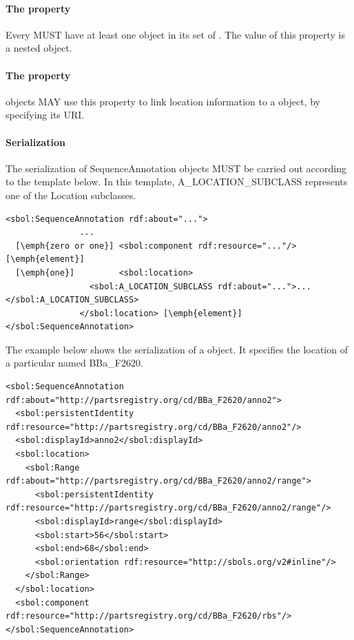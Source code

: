 \paragraph{The  property}\label{sec:locations}
\label{sec:locations}
Every  MUST have at least one  object in its set of . The value of this property is a nested  object.


\paragraph{The  property}\label{sec:component}
 objects MAY use this property to link location information to a  object, by specifying its URI.


\paragraph{Serialization}

The serialization of SequenceAnnotation objects MUST be carried out according to the template below. In this template, A\_LOCATION\_SUBCLASS represents one of the Location subclasses.
\begin{lstlisting}
<sbol:SequenceAnnotation rdf:about="...">
               ...   
  [\emph{zero or one}] <sbol:component rdf:resource="..."/> [\emph{element}] 
  [\emph{one}]         <sbol:location>
                 <sbol:A_LOCATION_SUBCLASS rdf:about="...">...</sbol:A_LOCATION_SUBCLASS>
               </sbol:location> [\emph{element}] 
</sbol:SequenceAnnotation>
\end{lstlisting}

The example below shows the serialization of a  object. It specifies the location of a particular  named BBa\_F2620.
\begin{lstlisting}
<sbol:SequenceAnnotation rdf:about="http://partsregistry.org/cd/BBa_F2620/anno2">
  <sbol:persistentIdentity rdf:resource="http://partsregistry.org/cd/BBa_F2620/anno2"/>
  <sbol:displayId>anno2</sbol:displayId>
  <sbol:location>
    <sbol:Range rdf:about="http://partsregistry.org/cd/BBa_F2620/anno2/range">
      <sbol:persistentIdentity rdf:resource="http://partsregistry.org/cd/BBa_F2620/anno2/range"/>
      <sbol:displayId>range</sbol:displayId>
      <sbol:start>56</sbol:start>
      <sbol:end>68</sbol:end>
      <sbol:orientation rdf:resource="http://sbols.org/v2#inline"/>
    </sbol:Range>
  </sbol:location>
  <sbol:component rdf:resource="http://partsregistry.org/cd/BBa_F2620/rbs"/>
</sbol:SequenceAnnotation>      
\end{lstlisting}

